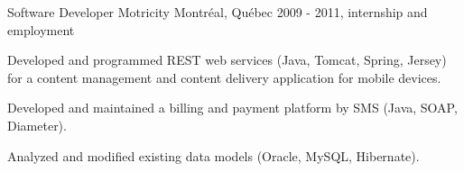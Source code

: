 \begin{cventries}
  \cventry
    {Software Developer} %
    {Motricity} %
    {Montréal, Québec} %
    {2009 - 2011, internship and employment} %
    {
      \begin{cvitems} %
        \item {Developed and programmed REST web services (Java, Tomcat, Spring, Jersey) for a content management and content delivery application for mobile devices.}
        \item {Developed and maintained a billing and payment platform by SMS (Java, SOAP, Diameter).}
        \item {Analyzed and modified existing data models (Oracle, MySQL, Hibernate).}
      \end{cvitems}
    }


\end{cventries}